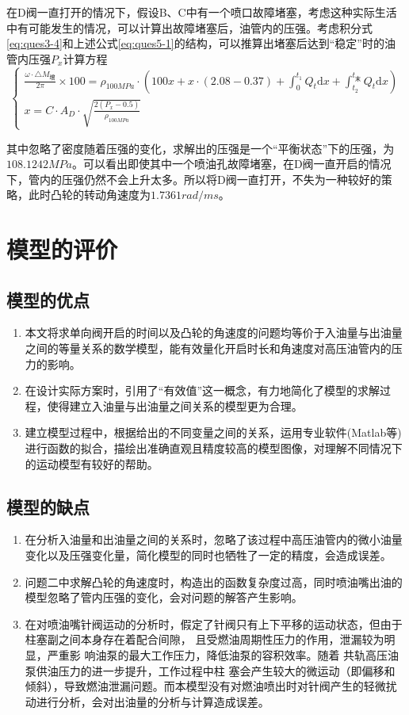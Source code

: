 \documentclass[withoutpreface,bwprint]{cumcmthesis} %
\begin{document}
在D阀一直打开的情况下，假设B、C中有一个喷口故障堵塞，考虑这种实际生活中有可能发生的情况，可以计算出故障堵塞后，油管内的压强。考虑积分式\cref{eq:ques3-4}和上述公式\cref{eq:ques5-1}的结构，可以推算出堵塞后达到“稳定”时的油管内压强$P_{x}$计算方程
\begin{equation}
\begin{cases}
\frac{\omega\cdot \triangle M_{\text{增}}}{2\pi}\times100 = \rho_{100MPa}\cdot \left(100x+x\cdot (2.08-0.37)+\int_{0}^{t_{1}}Q_{t}\text{d}x+\int_{t_{2}}^{t_{\text{末}}}Q_{t}\text{d}x\right)\\
x = C\cdot A_{D}\cdot \sqrt{\frac{2(P_{x}-0.5)}{\rho_{100MPa}}}
\end{cases}\label{eq:ques5-2}	
\end{equation}

其中忽略了密度随着压强的变化，求解出的压强是一个“平衡状态”下的压强，为$108.1242MPa$。可以看出即使其中一个喷油孔故障堵塞，在D阀一直开启的情况下，管内的压强仍然不会上升太多。所以将D阀一直打开，不失为一种较好的策略，此时凸轮的转动角速度为$1.7361rad/ms$。
\section{模型的评价}
\subsection{模型的优点}
\begin{enumerate}
	\item 本文将求单向阀开启的时间以及凸轮的角速度的问题均等价于入油量与出油量之间的等量关系的数学模型，能有效量化开启时长和角速度对高压油管内的压力的影响。
	\item 在设计实际方案时，引用了“有效值”这一概念，有力地简化了模型的求解过程，使得建立入油量与出油量之间关系的模型更为合理。
	\item 建立模型过程中，根据给出的不同变量之间的关系，运用专业软件(Matlab等)进行函数的拟合，描绘出准确直观且精度较高的模型图像，对理解不同情况下的运动模型有较好的帮助。

\end{enumerate}
\subsection{模型的缺点}
\begin{enumerate}
	\item 在分析入油量和出油量之间的关系时，忽略了该过程中高压油管内的微小油量变化以及压强变化量，简化模型的同时也牺牲了一定的精度，会造成误差。
	\item 问题二中求解凸轮的角速度时，构造出的函数复杂度过高，同时喷油嘴出油的模型忽略了管内压强的变化，会对问题的解答产生影响。
	\item 在对喷油嘴针阀运动的分析时，假定了针阀只有上下平移的运动状态，但由于柱塞副之间本身存在着配合间隙， 且受燃油周期性压力的作用，泄漏较为明显，严重影
	响油泵的最大工作压力，降低油泵的容积效率。随着 共轨高压油泵供油压力的进一步提升，工作过程中柱 塞会产生较大的微运动（即偏移和倾斜），导致燃油泄漏问题。而本模型没有对燃油喷出时对针阀产生的轻微扰动进行分析，会对出油量的分析与计算造成误差。

\end{enumerate}
\end{document}
